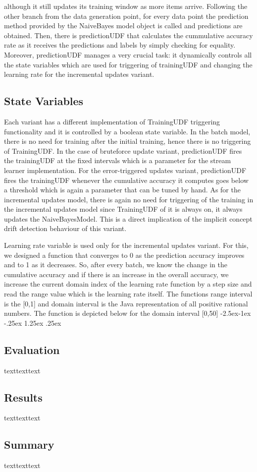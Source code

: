 \documentclass[12pt]{article}
\makeatletter
\renewcommand\paragraph{\@startsection{paragraph}{4}{\z@}%
            {-2.5ex\@plus -1ex \@minus -.25ex}%
            {1.25ex \@plus .25ex}%
            {\normalfont\normalsize\bfseries}}
\makeatother
\begin{document}
although it still updates its training window as more items arrive. Following the other branch from the data generation point, for every data point the prediction method provided by the NaiveBayes model object is called and predictions are obtained. Then, there is predictionUDF that calculates the cummulative accuracy rate as it receives the predictions and labels by simply checking for equality. Moreover, predictionUDF manages a very crucial task: it dynamically controls all the state variables which are used for triggering of trainingUDF and changing the learning rate for the incremental updates variant.

\subsection{State Variables}
Each variant has a different implementation of TrainingUDF triggering functionality and it is controlled by a boolean state variable. In the batch model, there is no need for training after the initial training, hence there is no triggering of TrainingUDF. In the case of bruteforce update variant, predictionUDF fires the trainingUDF at the fixed intervals which is a parameter for the stream learner implementation. For the error-triggered updates variant, predictionUDF fires the trainingUDF whenever the cumulative accuracy it computes goes below a threshold which is again a parameter that can be tuned by hand. As for the incremental updates model, there is again no need for triggering of the training in the incremental updates model since TrainingUDF of it is always on, it always updates the NaiveBayesModel. This is a direct implication of the implicit concept drift detection behaviour of this variant.

Learning rate variable is used only for the incremental updates variant. For this, we designed a function that converges to 0 as the prediction accuracy improves and to 1 as it decreases. So, after every batch, we know the change in the cumulative accuracy and if there is an increase in the overall accuracy, we increase the current domain index of the learning rate function by a step size and read the range value which is the learning rate itself. The functions range interval is the [0,1] and domain interval is the Java representation of all positive rational numbers. The function is depicted below for the domain interval [0,50]
\paragraph


\subsection{Evaluation}
texttexttext

\subsection{Results}
texttexttext

\subsection{Summary}
texttexttext

\newpage
\medskip

\end{document}
